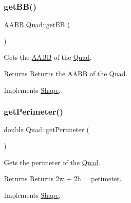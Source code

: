 \mbox{\label{class_quad_a8b7be43a01fb3263d36b0eb2f5961ccd}} 
\subsubsection{\texorpdfstring{getBB()}{getBB()}}
{\footnotesize\ttfamily \mbox{\hyperlink{class_a_a_b_b}{A\+A\+BB}} Quad\+::get\+BB (\begin{DoxyParamCaption}{ }\end{DoxyParamCaption})\hspace{0.3cm}{\ttfamily [virtual]}}



Gets the \mbox{\hyperlink{class_a_a_b_b}{A\+A\+BB}} of the \mbox{\hyperlink{class_quad}{Quad}}. 

\begin{DoxyReturn}{Returns}
Returns the \mbox{\hyperlink{class_a_a_b_b}{A\+A\+BB}} of the \mbox{\hyperlink{class_quad}{Quad}}. 
\end{DoxyReturn}


Implements \mbox{\hyperlink{class_shape_a2490226328b30c113a7f07e2edda5f94}{Shape}}.

\mbox{\label{class_quad_a8d438e2844a4a155ed61addfab1a2868}} 
\subsubsection{\texorpdfstring{getPerimeter()}{getPerimeter()}}
{\footnotesize\ttfamily double Quad\+::get\+Perimeter (\begin{DoxyParamCaption}{ }\end{DoxyParamCaption})\hspace{0.3cm}{\ttfamily [virtual]}}



Gets the perimeter of the \mbox{\hyperlink{class_quad}{Quad}}. 

\begin{DoxyReturn}{Returns}
Returns 2w + 2h = perimeter. 
\end{DoxyReturn}


Implements \mbox{\hyperlink{class_shape_a3918812ff3a143dabbeba2f650fb5e7c}{Shape}}.

\mbox{\label{class_quad_abc8023f3883c6fe4391e24418a4258ab}} 
